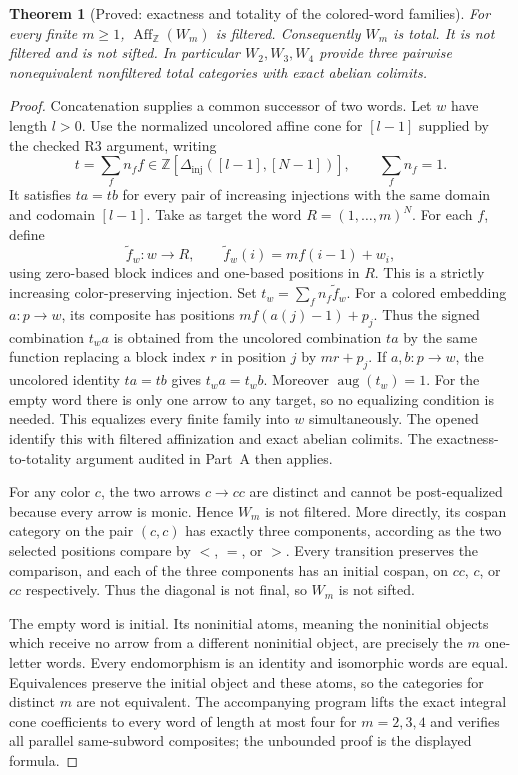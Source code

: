 \documentclass[11pt,a4paper]{article}
\newcommand{\Z}{\mathbb Z}
\newcommand{\Aff}{\operatorname{Aff}}
\newcommand{\aug}{\operatorname{aug}}
\newcommand{\Dinj}{\Delta_{\mathrm{inj}}}
\newtheorem{theorem}{Theorem}[section]
\theoremstyle{definition}
\begin{document}
\begin{theorem}[Proved: exactness and totality of the colored-word families]\label{E:word-exact}
For every finite $m\geq1$, $\Aff_{\Z}(W_m)$ is filtered.
Consequently $W_m$ is total. It is not filtered and is not sifted.
In particular $W_2,W_3,W_4$ provide three pairwise nonequivalent
nonfiltered total categories with exact abelian colimits.
\end{theorem}
\begin{proof}
Concatenation supplies a common successor of two words. Let $w$
have length $l>0$. Use the normalized uncolored affine cone for
$[l-1]$ supplied by the checked R3 argument, writing
\[
t=\sum_f n_f f\in\Z[\Dinj([l-1],[N-1])],\qquad
\sum_fn_f=1.
\]
It satisfies $ta=tb$ for every pair of increasing injections with
the same domain and codomain $[l-1]$. Take as target the word
$R=(1,\ldots,m)^N$. For each $f$, define
\[
\widetilde f_w:w\longrightarrow R,\qquad
\widetilde f_w(i)=m f(i-1)+w_i,
\]
using zero-based block indices and one-based positions in $R$.
This is a strictly increasing color-preserving injection. Set
$t_w=\sum_fn_f\widetilde f_w$. For a colored embedding
$a:p\to w$, its composite has positions
$m f(a(j)-1)+p_j$. Thus the signed combination $t_wa$ is obtained
from the uncolored combination $ta$ by the same function replacing
a block index $r$ in position $j$ by $mr+p_j$. If $a,b:p\to w$,
the uncolored identity $ta=tb$ gives $t_wa=t_wb$. Moreover
$\aug(t_w)=1$. For the empty word there is only one arrow to any
target, so no equalizing condition is needed. This equalizes every
finite family into $w$ simultaneously. The opened \citet[Lemma~1 and Theorem~1]{IsbellMitchell1973} identify this with filtered affinization and
exact abelian colimits. The exactness-to-totality argument audited
in Part~A then applies.

For any color $c$, the two arrows $c\to cc$ are distinct and
cannot be post-equalized because every arrow is monic. Hence
$W_m$ is not filtered. More directly, its cospan category on the
pair $(c,c)$ has exactly three components, according as the two
selected positions compare by $<$, $=$, or $>$. Every transition
preserves the comparison, and each of the three components has an
initial cospan, on $cc$, $c$, or $cc$ respectively. Thus the
diagonal is not final, so $W_m$ is not sifted.

The empty word is initial. Its noninitial atoms, meaning the
noninitial objects which receive no arrow from a different
noninitial object, are precisely the $m$ one-letter words. Every
endomorphism is an identity and isomorphic words are equal.
Equivalences preserve the initial object and these atoms, so the
categories for distinct $m$ are not equivalent. The accompanying
program lifts the exact integral cone coefficients to every word
of length at most four for $m=2,3,4$ and verifies all parallel
same-subword composites; the unbounded proof is the displayed
formula.
\end{proof}
\end{document}
